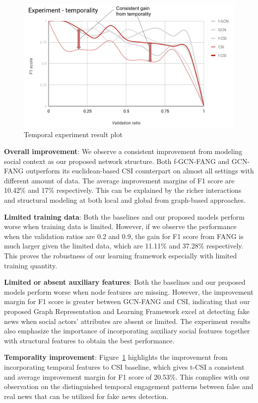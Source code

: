 \documentclass[fyp]{socreport}
\theoremstyle{definition}
\theoremstyle{hypothesis}
\begin{document}
\begin{figure}[t]
\centering
\includegraphics[scale=0.5]{time_experiment_plot.png}
\caption{Temporal experiment result plot}
\label{fig:time_experiment_plot}
\end{figure}

\textbf{Overall improvement}: We observe a consistent improvement from modeling social context as our proposed network structure. Both f-GCN-FANG and GCN-FANG outperform its euclidean-based CSI counterpart on almost all settings with different amount of data. The average improvement margins of F1 score are 10.42\% and 17\% respectively. This can be explained by the richer interactions and structural modeling at both local and global from graph-based approaches. 

\textbf{Limited training data}: Both the baselines and our proposed models perform worse when training data is limited. However, if we observe the performance when the validation ratios are 0.2 and 0.9, the gain for F1 score from FANG is much larger given the limited data, which are 11.11\% and 37.28\% respectively. This proves the robustness of our learning framework especially with limited training quantity.

\textbf{Limited or absent auxiliary features}: Both the baselines and our proposed models perform worse when node features are missing. However, the improvement margin for F1 score is greater between GCN-FANG and CSI, indicating that our proposed Graph Representation and Learning Framework excel at detecting fake news when social actors' attributes are absent or limited. The experiment results also emphasize the importance of incorporating auxiliary social features together with structural features to obtain the best performance.

\textbf{Temporality improvement}: Figure~\ref{fig:time_experiment_plot} highlights the improvement from incorporating temporal features to CSI baseline, which gives t-CSI a consistent and average improvement margin for F1 score of 20.53\%. This complies with our observation on the distinguished temporal engagement patterns between false and real news that can be utilized for fake news detection.
\end{document}
